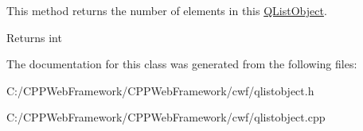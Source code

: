 This method returns the number of elements in this \mbox{\hyperlink{class_q_list_object}{Q\+List\+Object}}. 

\begin{DoxyReturn}{Returns}
int 
\end{DoxyReturn}


The documentation for this class was generated from the following files\+:\begin{DoxyCompactItemize}
\item 
C\+:/\+C\+P\+P\+Web\+Framework/\+C\+P\+P\+Web\+Framework/cwf/qlistobject.\+h\item 
C\+:/\+C\+P\+P\+Web\+Framework/\+C\+P\+P\+Web\+Framework/cwf/qlistobject.\+cpp\end{DoxyCompactItemize}
